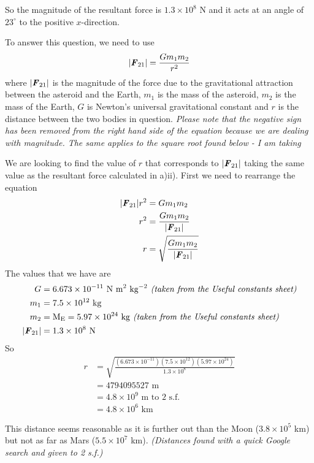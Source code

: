 \documentclass[a4paper,12pt]{article}
\numberwithin{equation}{section}
\begin{document}
\begin{question}
So the magnitude of the resultant force is $1.3\times10^8$ N and it acts at an angle of $23^\circ$ to the positive $x$-direction.

\newpage

\qpart
To answer this question, we need to use
\[
|\textbf{\textit{F}}_{21}|=\frac{Gm_1m_2}{r^2}
\]
where $|\textbf{\textit{F}}_{21}|$ is the magnitude of the force due to the gravitational attraction between the asteroid and the Earth, $m_1$ is the mass of the asteroid, $m_2$ is the mass of the Earth, $G$ is Newton's universal gravitational constant and $r$ is the distance between the two bodies in question. \textit{Please note that the negative sign has been removed from the right hand side of the equation because we are dealing with magnitude. The same applies to the square root found below - I am taking }

We are looking to find the value of $r$ that corresponds to $|\textbf{\textit{F}}_{21}|$ taking the same value as the resultant force calculated in a)ii). First we need to rearrange the equation
\begin{align*}
|\textbf{\textit{F}}_{21}|r^2 &= Gm_1m_2\\
r^2&=\frac{Gm_1m_2}{|\textbf{\textit{F}}_{21}|}\\
r&=\sqrt{\frac{Gm_1m_2}{|\textbf{\textit{F}}_{21}|}}
\end{align*}
The values that we have are
\begin{align*}
G &= 6.673 \times 10^{-11} \text{ N m}^2\text{ kg}^{-2} \textit{ (taken from the Useful constants sheet)}\\
m_1&=7.5 \times 10^{12} \text{ kg}\\
m_2&=\text{M}_\text{E}=5.97\times10^{24}\text{ kg} \textit{ (taken from the Useful constants sheet)}\\
|\textbf{\textit{F}}_{21}|&=1.3 \times 10^8\text{ N}
\end{align*}
So
\begin{align*}
r &= \sqrt{\frac{(6.673 \times 10^{-11})(7.5 \times 10^{12})(5.97\times10^{24})}{1.3 \times 10^8}}\\
&= 4794095527 \text{ m}\\
&= 4.8 \times10^9 \text{ m to 2 s.f.}\\
&= 4.8 \times10^6 \text{ km}
\end{align*}

This distance seems reasonable as it is further out than the Moon ($3.8\times10^5$ km) but not as far as Mars ($5.5\times10^7$ km). \textit{(Distances found with a quick Google search and given to 2 s.f.)}


\end{question}
\end{document}
